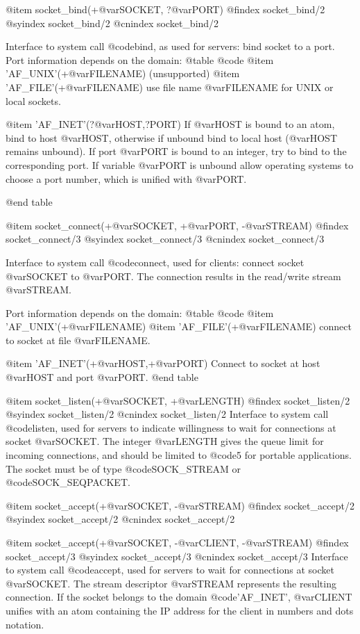 {{{{{@item socket_bind(+@var{SOCKET}, ?@var{PORT})
@findex socket_bind/2
@syindex socket_bind/2
@cnindex socket_bind/2

Interface to system call @code{bind}, as used for servers: bind socket
to a port. Port information depends on the domain:
@table @code
@item 'AF_UNIX'(+@var{FILENAME}) (unsupported)
@item 'AF_FILE'(+@var{FILENAME})
use file name @var{FILENAME} for UNIX or local sockets.

@item 'AF_INET'(?@var{HOST},?PORT)
If @var{HOST} is bound to an atom, bind to host @var{HOST}, otherwise
if unbound bind to local host (@var{HOST} remains unbound). If port
@var{PORT} is bound to an integer, try to bind to the corresponding
port. If variable @var{PORT} is unbound allow operating systems to
choose a port number, which is unified with @var{PORT}.

@end table

@item socket_connect(+@var{SOCKET}, +@var{PORT}, -@var{STREAM})
@findex socket_connect/3
@syindex socket_connect/3
@cnindex socket_connect/3

Interface to system call @code{connect}, used for clients: connect
socket @var{SOCKET} to @var{PORT}. The connection results in the
read/write stream @var{STREAM}.

Port information depends on the domain:
@table @code
@item 'AF_UNIX'(+@var{FILENAME})
@item 'AF_FILE'(+@var{FILENAME})
connect to socket at file @var{FILENAME}.

@item 'AF_INET'(+@var{HOST},+@var{PORT})
Connect to socket at host @var{HOST} and port @var{PORT}.
@end table

@item socket_listen(+@var{SOCKET}, +@var{LENGTH})
@findex socket_listen/2
@syindex socket_listen/2
@cnindex socket_listen/2
Interface to system call @code{listen}, used for servers to indicate
willingness to wait for connections at socket @var{SOCKET}. The
integer @var{LENGTH} gives the queue limit for incoming connections,
and should be limited to @code{5} for portable applications. The socket
must be of type @code{SOCK_STREAM} or @code{SOCK_SEQPACKET}.

@item socket_accept(+@var{SOCKET}, -@var{STREAM})
@findex socket_accept/2
@syindex socket_accept/2
@cnindex socket_accept/2

@item socket_accept(+@var{SOCKET}, -@var{CLIENT}, -@var{STREAM})
@findex socket_accept/3
@syindex socket_accept/3
@cnindex socket_accept/3
Interface to system call @code{accept}, used for servers to wait for
connections at socket @var{SOCKET}. The stream descriptor @var{STREAM}
represents the resulting connection.  If the socket belongs to the
domain @code{'AF_INET'}, @var{CLIENT} unifies with an atom containing
the IP address for the client in numbers and dots notation.

}}}}}

